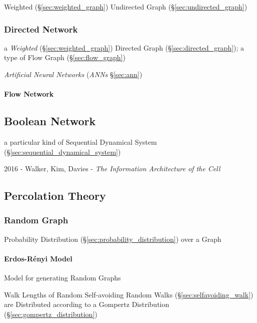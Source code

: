 Weighted (\S\ref{sec:weighted_graph}) Undirected Graph
(\S\ref{sec:undirected_graph})



\subsubsection{Directed Network}\label{sec:directed_network}

a \emph{Weighted} (\S\ref{sec:weighted_graph}) Directed Graph
(\S\ref{sec:directed_graph}); a type of Flow Graph (\S\ref{sec:flow_graph})

\fist \emph{Artificial Neural Networks} (\emph{ANNs} \S\ref{sec:ann})



\paragraph{Flow Network}\label{sec:flow_network}\hfill



\subsection{Boolean Network}\label{sec:boolean_network}


a particular kind of Sequential Dynamical System
(\S\ref{sec:sequential_dynamical_system})

2016 - Walker, Kim, Davies - \emph{The Information Architecture of the Cell}



\subsection{Percolation Theory}\label{sec:percolation_theory}

\subsubsection{Random Graph}\label{sec:random_graph}

Probability Distribution (\S\ref{sec:probability_distribution}) over a Graph



\paragraph{Erdos-R\'enyi Model}\label{sec:erdos_renyi_model}\hfill

Model for generating Random Graphs

Walk Lengths of Random Self-avoiding Random Walks
(\S\ref{sec:selfavoiding_walk}) are Distributed according to a Gompertz
Distribution (\S\ref{sec:gompertz_distribution})
